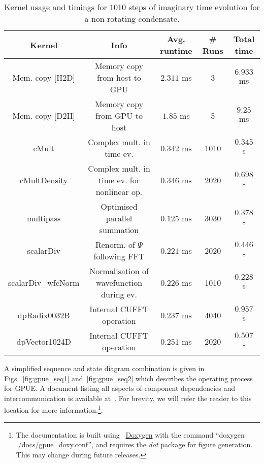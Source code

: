 \begin{table}
    \scriptsize
    \centering
\begin{tabular}{c|c|c|c|c}
\textbf{Kernel}  & \textbf{Info} & \textbf{Avg. runtime} & \textbf{\# Runs} & \textbf{Total time} \\
\hline
Mem. copy [H2D] & Memory copy from host to GPU & $2.311$ ms & 3 & $6.933$ ms\\
Mem. copy [D2H] & Memory copy from GPU to host & $1.85$ ms & 5 & $9.25$ ms\\
cMult & Complex mult. in time ev. & $0.342$ ms & 1010 & $0.345$ s\\
cMultDensity & Complex mult. in time ev. for nonlinear op. & $0.346$ ms & 2020 & $0.698$ s \\
multipass & Optimised parallel summation & $0.125$ ms & 3030 & $0.378$ s \\
scalarDiv & Renorm. of $\Psi$ following FFT & $0.221$ ms & 2020 & $0.446$ s \\
scalarDiv_wfcNorm & Normalisation of wavefunction during ev. & $0.226$ ms & 1010 & $0.228$ s\\
dpRadix0032B & Internal CUFFT operation & $0.237$ ms & 4040 & $0.957$ s \\
dpVector1024D & Internal CUFFT operation & $0.251$ ms & 2020 & $0.507$ s \\
\end{tabular}
\caption{Kernel usage and timings for 1010 steps of imaginary time evolution for a non-rotating condensate.}\label{tbl:gpue_im}
\end{table}

A simplified sequence and state diagram combination is given in Figs.~\ref{fig:gpue_seq1} and~\ref{fig:gpue_seq2} which describes the operating process for GPUE. A document listing all aspects of component dependencies and intercommunication is available at~\cite{MLXD_GPUE}. For brevity, we will refer the reader to this location for more information.\footnote{The documentation is built using ~\href{http://www.stack.nl/~dimitri/doxygen/}{Doxygen} with the command ``doxygen ./docs/gpue_doxy.conf'', and requires the \textit{dot} package for figure generation. This may change during future releases.}.

